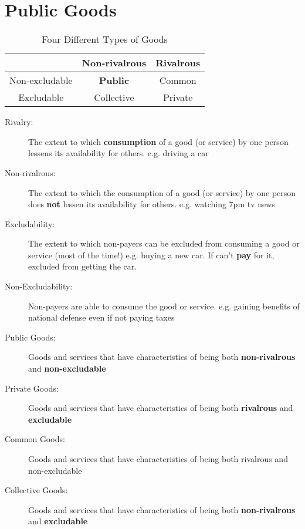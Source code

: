 \section{Public Goods}
\begin{table}[H]
	\centering
	\begin{tabular}{c|cc}
		& Non-rivalrous & Rivalrous\\\hline
		Non-excludable & \textbf{Public} & Common\\
		Excludable & Collective & Private
	\end{tabular}
	\caption{Four Different Types of Goods}
\end{table}
\begin{description}
	\item[Rivalry:] The extent to which \textbf{consumption} of a good (or service) by one person lessens its availability for others. e.g. driving a car
	\item[Non-rivalrous:] The extent to which the consumption of a good (or service) by one person does \textbf{not} lessen its availability for others. e.g. watching 7pm tv news
	\item[Excludability:] The extent to which non-payers can be excluded from consuming a good or service (most of the time!) e.g. buying a new car. If can't \textbf{pay} for it, excluded from getting the car.
	\item[Non-Excludability:] Non-payers are able to consume the good or service. e.g. gaining benefits of national defense even if not paying taxes
\end{description}
\vspace{3em}
\begin{description}
	\item[Public Goods:] Goods and services that have characteristics of being both \textbf{non-rivalrous} and \textbf{non-excludable}
	\item[Private Goods:] Goods and services that have characteristics of being both \textbf{rivalrous} and \textbf{excludable}
	\item[Common Goods:] Goods and services that have characteristics of being both rivalrous and non-excludable
	\item[Collective Goods:] Goods and services that have characteristics of being both \textbf{non-rivalrous} and \textbf{excludable}
\end{description}

\vspace{2em}

